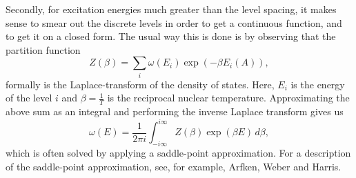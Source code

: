 Secondly, for excitation energies much greater than the level spacing, it makes sense to smear out the discrete levels in order to get a continuous function, and to get it on a closed form. The usual way this is done is by observing that the partition function 
\begin{equation}
Z(\beta) = \sum_{i} \omega(E_i) \exp{(- \beta E_i(A))},
\end{equation}
formally is the Laplace-transform of the density of states. 
Here, $E_i$ is the energy of the level $i$ and $\beta=\frac{1}{T}$ is the reciprocal nuclear temperature.
Approximating the above sum as an integral and performing the inverse Laplace transform gives us
\begin{equation}
\omega(E) = \frac{1}{2\pi i} \int_{-i\infty}^{i\infty} Z(\beta)\exp{(\beta E)}\,d\beta,
\end{equation} 
which is often solved by applying a saddle-point approximation. For a description of the saddle-point approximation, see, for example,  Arfken, Weber and Harris\cite{arfken2012mathematical}.

